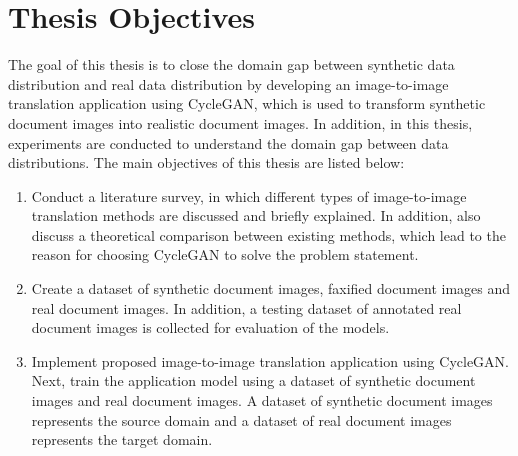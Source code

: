 \section{Thesis Objectives}\label{thesisobjectives}
The goal of this thesis is to close the domain gap between synthetic data distribution and real data distribution by developing an image-to-image translation application using \ac{CycleGAN}, which is used to transform synthetic document images into realistic document images. In addition, in this thesis, experiments are conducted to understand the domain gap between data distributions. The main objectives of this thesis are listed below:
\begin{enumerate}
\item Conduct a literature survey, in which different types of image-to-image translation methods are discussed and briefly explained. In addition, also discuss a theoretical comparison between existing methods, which lead to the reason for choosing \ac{CycleGAN} to solve the problem statement. 

\item Create a dataset of synthetic document images, faxified document images and real document images. In addition, a testing dataset of annotated real document images is collected for evaluation of the models.

\item Implement proposed image-to-image translation application using \ac{CycleGAN}. Next, train the application model using a dataset of synthetic document images and real document images. A dataset of synthetic document images represents the source domain and a dataset of real document images represents the target domain.


\end{enumerate}
